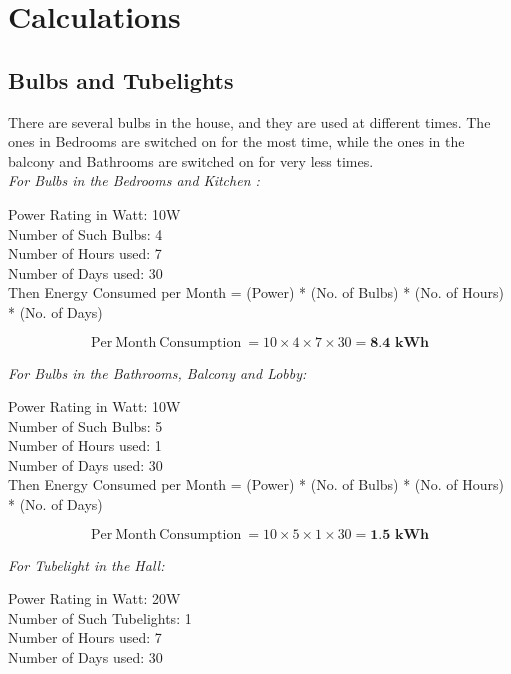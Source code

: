 \documentclass[11pt,a4paper]{article}
\begin{document}
\section{Calculations}

\subsection{Bulbs and Tubelights}
There are several bulbs in the house, and they are used at different times. The ones in Bedrooms are switched on for the most time, while the ones in the balcony and Bathrooms are switched on for very less times. \\

\noindent
\textit{For Bulbs in the Bedrooms and Kitchen :\\}

\noindent
Power Rating in Watt: 10W\\
Number of Such Bulbs: 4\\
Number of Hours used: 7\\
Number of Days used: 30\\

Then Energy Consumed per Month = (Power) * (No. of Bulbs) * (No. of Hours) * (No. of Days)

$$
\mathrm{Per\ Month\ Consumption\ } = 10 \times 4 \times 7 \times 30 = \textbf{8.4\ kWh}
$$

\noindent
\textit{For Bulbs in the Bathrooms, Balcony and Lobby:\\}

\noindent
Power Rating in Watt: 10W\\
Number of Such Bulbs: 5\\
Number of Hours used: 1\\
Number of Days used: 30\\

Then Energy Consumed per Month = (Power) * (No. of Bulbs) * (No. of Hours) * (No. of Days)

$$
\mathrm{Per\ Month\ Consumption\ } = 10 \times 5 \times 1 \times 30 = \textbf{1.5\ kWh}
$$

\noindent
\textit{For Tubelight in the Hall:\\
}

\noindent
Power Rating in Watt: 20W\\
Number of Such Tubelights: 1\\
Number of Hours used: 7\\
Number of Days used: 30\\
\end{document}
